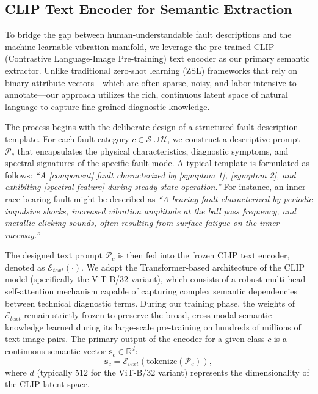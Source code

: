 \documentclass[journal,12pt,onecolumn]{IEEEtran}
\begin{document}
\subsection{CLIP Text Encoder for Semantic Extraction}
To bridge the gap between human-understandable fault descriptions and the machine-learnable vibration manifold, we leverage the pre-trained CLIP (Contrastive Language-Image Pre-training) text encoder as our primary semantic extractor. Unlike traditional zero-shot learning (ZSL) frameworks that rely on binary attribute vectors—which are often sparse, noisy, and labor-intensive to annotate—our approach utilizes the rich, continuous latent space of natural language to capture fine-grained diagnostic knowledge.

The process begins with the deliberate design of a structured fault description template. For each fault category $c \in \mathcal{S} \cup \mathcal{U}$, we construct a descriptive prompt $\mathcal{P}_c$ that encapsulates the physical characteristics, diagnostic symptoms, and spectral signatures of the specific fault mode. A typical template is formulated as follows: \textit{``A [component] fault characterized by [symptom 1], [symptom 2], and exhibiting [spectral feature] during steady-state operation.''} For instance, an inner race bearing fault might be described as \textit{``A bearing fault characterized by periodic impulsive shocks, increased vibration amplitude at the ball pass frequency, and metallic clicking sounds, often resulting from surface fatigue on the inner raceway.''}

The designed text prompt $\mathcal{P}_c$ is then fed into the frozen CLIP text encoder, denoted as $\mathcal{E}_{text}(\cdot)$. We adopt the Transformer-based architecture of the CLIP model (specifically the ViT-B/32 variant), which consists of a robust multi-head self-attention mechanism capable of capturing complex semantic dependencies between technical diagnostic terms. During our training phase, the weights of $\mathcal{E}_{text}$ remain strictly frozen to preserve the broad, cross-modal semantic knowledge learned during its large-scale pre-training on hundreds of millions of text-image pairs. The primary output of the encoder for a given class $c$ is a continuous semantic vector $\mathbf{s}_c \in \mathbb{R}^d$:
\begin{equation}
    \mathbf{s}_c = \mathcal{E}_{text}(\text{tokenize}(\mathcal{P}_c)),
\end{equation}
where $d$ (typically 512 for the ViT-B/32 variant) represents the dimensionality of the CLIP latent space.
\end{document}
